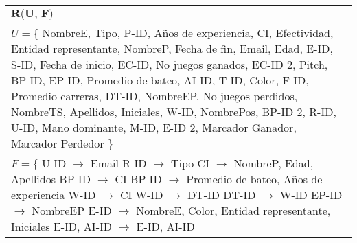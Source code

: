 \documentclass{report}
\begin{document}
    \begin{tabularx}{\textwidth}{|X|}
        \toprule
        \hfil $\textbf{R(U, F)}$ \\
        \midrule
        \vspace*{0.01cm}
        $U = \{ $ NombreE, Tipo, P-ID, Años de experiencia, CI, Efectividad, Entidad representante, NombreP, Fecha 
        de fin, Email, Edad, E-ID, S-ID, Fecha de inicio, EC-ID, No juegos ganados, EC-ID 2, Pitch, BP-ID, EP-ID, 
        Promedio de bateo, AI-ID, T-ID, Color, F-ID, Promedio carreras, DT-ID, NombreEP, No juegos perdidos, 
        NombreTS, Apellidos, Iniciales, W-ID, NombrePos, BP-ID 2, R-ID, U-ID, Mano dominante, M-ID, E-ID 2, 
        Marcador Ganador, Marcador Perdedor $\} $ 
        \vspace*{0.15cm} \\
        \midrule
        \vspace*{0.01cm}
        $F = \{$
                U-ID $\rightarrow$ Email \newline
                \hspace*{0.9cm} R-ID $\rightarrow$ Tipo \newline
                \hspace*{0.9cm} CI $\rightarrow$ NombreP,  Edad,  Apellidos \newline
                \hspace*{0.9cm} BP-ID $\rightarrow$ CI \newline
                \hspace*{0.9cm} BP-ID $\rightarrow$ Promedio de bateo,  Años de experiencia \newline
                \hspace*{0.9cm} W-ID $\rightarrow$ CI \newline
                \hspace*{0.9cm} W-ID $\rightarrow$ DT-ID \newline
                \hspace*{0.9cm} DT-ID $\rightarrow$ W-ID \newline
                \hspace*{0.9cm} EP-ID $\rightarrow$ NombreEP \newline
                \hspace*{0.9cm} E-ID $\rightarrow$ NombreE,  Color,  Entidad representante,  Iniciales \newline
                \hspace*{0.9cm} E-ID,  AI-ID $\rightarrow$ E-ID,  AI-ID \newline

\end{tabularx}
\end{document}
